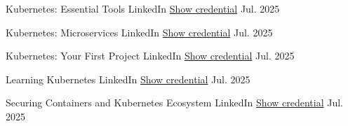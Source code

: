 \begin{cvhonors}
  \cvhonor
    {Kubernetes: Essential Tools} %
    {LinkedIn} %
    {\href{https://www.linkedin.com/learning/certificates/d44a3392a7d869f5948f115ad5260b2eefe51b9d983c2b5beb178e21c3ae4bda}{Show credential}} %
    {Jul. 2025} %

  \cvhonor
    {Kubernetes: Microservices} %
    {LinkedIn} %
    {\href{https://www.linkedin.com/learning/certificates/a7ae33c4841a89d06053ef07741440aafd45ac8dbd768368f34253e39d5dd63c}{Show credential}} %
    {Jul. 2025} %

  \cvhonor
    {Kubernetes: Your First Project} %
    {LinkedIn} %
    {\href{https://www.linkedin.com/learning/certificates/049cacf560bc7053fd22af39193afb86de8c33f2051f5a508ffbec3972cae4ad}{Show credential}} %
    {Jul. 2025} %

  \cvhonor
    {Learning Kubernetes} %
    {LinkedIn} %
    {\href{https://www.linkedin.com/learning/certificates/d47fad25faa17a42ff9821acf3024d3d6f6e1bab50c4b6a9648d36ba5e92449a}{Show credential}} %
    {Jul. 2025} %

  \cvhonor
    {Securing Containers and Kubernetes Ecosystem} %
    {LinkedIn} %
    {\href{https://www.linkedin.com/learning/certificates/5b1bc27b8faf14fba774d919159f27e8b1a315999330c305bf40668fa2b69a5f}{Show credential}} %
    {Jul. 2025} %

\end{cvhonors}

